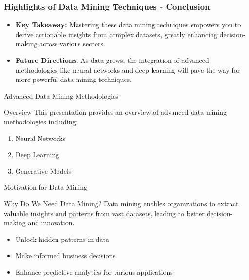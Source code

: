 \documentclass[aspectratio=169]{beamer}
\begin{document}
\begin{frame}[fragile]
    \frametitle{Highlights of Data Mining Techniques - Conclusion}
    \begin{itemize}
        \item \textbf{Key Takeaway:} Mastering these data mining techniques empowers you to derive actionable insights from complex datasets, greatly enhancing decision-making across various sectors.
        \item \textbf{Future Directions:} As data grows, the integration of advanced methodologies like neural networks and deep learning will pave the way for more powerful data mining techniques.
    \end{itemize}
\end{frame}

\begin{frame}[fragile]{Advanced Data Mining Methodologies}
    \begin{block}{Overview}
        This presentation provides an overview of advanced data mining methodologies including:
        \begin{enumerate}
            \item Neural Networks
            \item Deep Learning
            \item Generative Models
        \end{enumerate}
    \end{block}
\end{frame}

\begin{frame}[fragile]{Motivation for Data Mining}
    \begin{block}{Why Do We Need Data Mining?}
        Data mining enables organizations to extract valuable insights and patterns from vast datasets, leading to better decision-making and innovation.
    \end{block}
    
    \begin{itemize}
        \item Unlock hidden patterns in data
        \item Make informed business decisions
        \item Enhance predictive analytics for various applications
    \end{itemize}
\end{frame}
\end{document}
